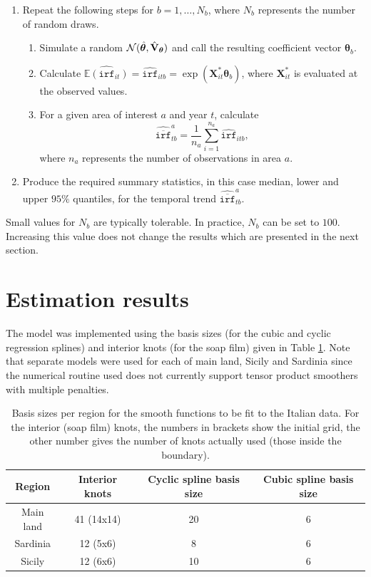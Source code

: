 \begin{enumerate}
	\item Repeat the following steps for $b=1,\ldots,N_b$, where $N_b$ represents the number of random draws. 
	   \begin{enumerate}
	      \item Simulate a random $\mathcal{N}(\hat{\bm\theta}, \hat{{\bf V}}_{\bm\theta} )$ and call the resulting coefficient vector $\bm\theta_b$.
	      \item Calculate $\widehat{\mathbb{E}(\texttt{irf}_{it})}=\widehat{\texttt{irf}}_{itb}=\exp(\mathbf{X}^*_{it}\bm\theta_b)$, where $\mathbf{X}^*_{it}$ is evaluated at the observed values. 
	      \item For a given area of interest $a$ and year $t$, calculate
	      $$\widehat{\overline{\texttt{irf}}}_{tb}^a=\frac{1}{n_a}\sum_{i=1}^{n_a} \widehat{\texttt{irf}}_{itb},$$
	      where $n_a$ represents the number of observations in area $a$.     
	   \end{enumerate}
	\item Produce the required summary statistics, in this case median, lower and upper $95\%$ quantiles, for the temporal trend $\widehat{\overline{\texttt{irf}}}_{tb}^a$.
\end{enumerate}
Small values for $N_b$ are typically tolerable. In practice, $N_b$ can be set to $100$. Increasing this value does not change the results which are presented in the next section.
 

\section{Estimation results \label{ER}}

The model was implemented using the basis sizes (for the cubic and cyclic regression splines) and interior knots (for the soap film) given in Table \ref{soap-basis-table}. Note that separate models were used for each of main land, Sicily and Sardinia since the numerical routine used does not currently support tensor product smoothers with multiple penalties. 

\begin{table}[t]
\centering
\begin{tabular}{c c c c}\\
Region & Interior knots & Cyclic spline basis size & Cubic spline basis size\\
\hline
Main land & 41 (14x14) & 20 & 6\\
Sardinia & 12 (5x6) & 8 & 6\\
Sicily & 12 (6x6) & 10 & 6\\
\end{tabular}
\caption{Basis sizes per region for the smooth functions to be fit to the Italian data. For the interior (soap film) knots, the numbers in brackets show the initial grid, the other number gives the number of knots actually used (those inside the boundary).}
\label{soap-basis-table}
\end{table}

